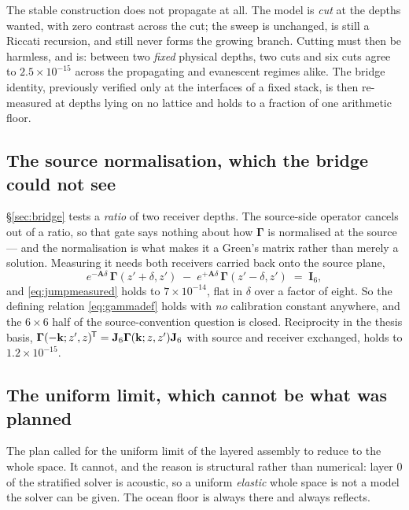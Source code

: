\documentclass[11pt,a4paper]{article}
\newcommand{\bA}{\mathbf{A}}
\newcommand{\Jsix}{\mathbf{J}_{6}}
\newcommand{\Isix}{\mathbf{I}_{6}}
\newcommand{\tp}{^{\mkern-1.5mu\mathsf{T}}}
\begin{document}
The stable construction does not propagate at all.  The model is \emph{cut} at
the depths wanted, with zero contrast across the cut; the sweep is unchanged, is
still a Riccati recursion, and still never forms the growing branch.  Cutting
must then be harmless, and is: between two \emph{fixed} physical depths, two
cuts and six cuts agree to $2.5\times10^{-15}$ across the propagating and
evanescent regimes alike.  The bridge identity, previously verified only at the
interfaces of a fixed stack, is then re-measured at depths lying on no lattice
and holds to a fraction of one arithmetic floor.

\subsection{The source normalisation, which the bridge could not see}

\S\ref{sec:bridge} tests a \emph{ratio} of two receiver depths.  The source-side
operator cancels out of a ratio, so that gate says nothing about how
$\boldsymbol\Gamma$ is normalised at the source --- and the normalisation is
what makes it a Green's matrix rather than merely a solution.  Measuring it
needs both receivers carried back onto the source plane,
\begin{equation}\label{eq:jumpmeasured}
  e^{-\bA\delta}\,\boldsymbol\Gamma(z'{+}\delta,z')
  \;-\;
  e^{+\bA\delta}\,\boldsymbol\Gamma(z'{-}\delta,z')
  \;=\; \Isix ,
\end{equation}
and \eqref{eq:jumpmeasured} holds to $7\times10^{-14}$, flat in $\delta$ over a
factor of eight.  So the defining relation \eqref{eq:gammadef} holds
with \emph{no} calibration constant anywhere, and the $6\times6$ half of the
source-convention question is closed.  Reciprocity in the thesis basis,
$\boldsymbol\Gamma(-\mathbf{k};z',z)\tp =
\Jsix\boldsymbol\Gamma(\mathbf{k};z,z')\Jsix$ with source and receiver
exchanged, holds to $1.2\times10^{-15}$.

\subsection{The uniform limit, which cannot be what was planned}

The plan called for the uniform limit of the layered assembly to reduce to the
whole space.  It cannot, and the reason is structural rather than numerical:
layer $0$ of the stratified solver is acoustic, so a uniform \emph{elastic}
whole space is not a model the solver can be given.  The ocean floor is always
there and always reflects.
\end{document}
